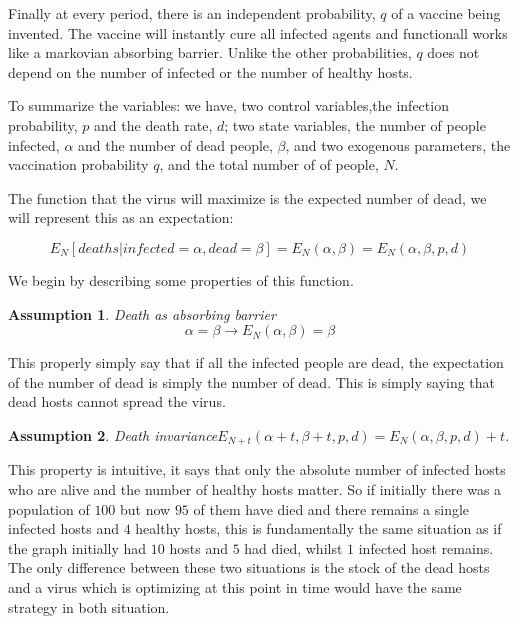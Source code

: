 \documentclass[12pt]{report}
\newtheorem{assumption}{Assumption}
\numberwithin{equation}{section}
\begin{document}
Finally at every period, there is an independent probability, $q$ of a vaccine being invented. The vaccine will instantly cure all infected agents and functionall works like a markovian absorbing barrier. Unlike the other probabilities, $q$ does not depend on the number of infected or the number of healthy hosts. 

To summarize the variables: we have, two control variables,the infection probability, $p$ and the death rate, $d$; two state variables, the number of people infected, $\alpha$ and the number of dead people, $\beta$, and two exogenous parameters, the vaccination probability $q$, and the total number of of people, $N$.  

The function that the virus will maximize is the expected number of dead, we will represent this as an expectation: 

\begin{equation*}
E_N[deaths | infected= \alpha, dead = \beta ] = E_N(\alpha ,\beta) = E_N(\alpha ,\beta, p, d) 
\end{equation*}

We begin by describing some properties of this function. 

\begin{assumption}{Death as absorbing barrier}\label{ass1}
\begin{equation}
\alpha = \beta \rightarrow E_N(\alpha,\beta)= \beta
\end{equation}
\end{assumption}

This properly simply say that if all the infected people are dead, the expectation of the number of dead is simply the number of dead. This is simply saying that dead hosts cannot spread the virus. 


\begin{assumption}{Death invariance}\label{ass2}
$E_{N+t}(\alpha +t,\beta +t, p, d)=E_{N}(\alpha , \beta ,p, d) + t$.
\end{assumption}

This property is intuitive, it says that only the absolute number of infected hosts who are alive and the number of healthy hosts matter. So if initially there was a population of $100$ but now $95$ of them have died and there remains a single infected hosts and $4$ healthy hosts, this is fundamentally the same situation as if the graph initially had $10$ hosts and $5$ had died, whilst $1$ infected host remains. The only difference between these two situations is the stock of the dead hosts and a virus which is optimizing at this point in time would have the same strategy in both situation. 
\end{document}
